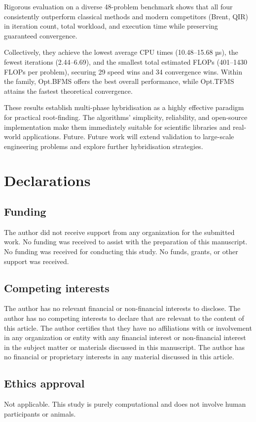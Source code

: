 \documentclass[amsmath, amssymb, aps]{revtex4-2}
\begin{document}
Rigorous evaluation on a diverse 48-problem benchmark shows that all four consistently outperform classical methods and modern competitors (Brent, QIR) in iteration count, total workload, and execution time while preserving guaranteed convergence.

Collectively, they achieve the lowest average CPU times (10.48–15.68 µs), the fewest iterations (2.44–6.69), and the smallest total estimated FLOPs (401–1430 FLOPs per problem), securing 29 speed wins and 34 convergence wins. Within the family, Opt.BFMS offers the best overall performance, while Opt.TFMS attains the fastest theoretical convergence.

These results establish multi-phase hybridisation as a highly effective paradigm for practical root-finding. The algorithms’ simplicity, reliability, and open-source implementation make them immediately suitable for scientific libraries and real-world applications. Future. Future work will extend validation to large-scale engineering problems and explore further hybridisation strategies.

\section{Declarations}\label{sec:declaration}

\subsection{Funding}
The author did not receive support from any organization for the submitted work. No funding was received to assist with the preparation of this manuscript. No funding was received for conducting this study. No funds, grants, or other support was received.

\subsection{Competing interests}
The author has no relevant financial or non-financial interests to disclose. The author has no competing interests to declare that are relevant to the content of this article. The author certifies that they have no affiliations with or involvement in any organization or entity with any financial interest or non-financial interest in the subject matter or materials discussed in this manuscript. The author has no financial or proprietary interests in any material discussed in this article.

\subsection{Ethics approval}
Not applicable. This study is purely computational and does not involve human participants or animals.
\end{document}
